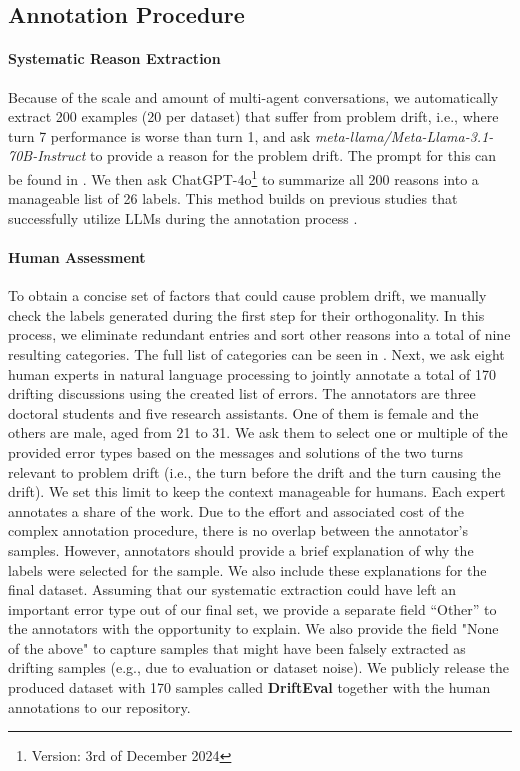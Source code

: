 \twocolumn

\subsection{Annotation Procedure}

\paragraph{\textbf{Systematic Reason Extraction}}
Because of the scale and amount of multi-agent conversations, we automatically extract 200 examples (20 per dataset) that suffer from problem drift, i.e., where turn 7 performance is worse than turn 1, and ask \textit{meta-llama/Meta-Llama-3.1-70B-Instruct} to provide a reason for the problem drift.
The prompt for this can be found in .
We then ask ChatGPT-4o\footnote{Version: 3rd of December 2024} to summarize all 200 reasons into a manageable list of 26 labels.
This method builds on previous studies that successfully utilize LLMs during the annotation process \citep{WangKRM24, KimMCR24}.

\paragraph{\textbf{Human Assessment}}
To obtain a concise set of factors that could cause problem drift, we manually check the labels generated during the first step for their orthogonality.
In this process, we eliminate redundant entries and sort other reasons into a total of nine resulting categories.
The full list of categories can be seen in .
Next, we ask eight human experts in natural language processing to jointly annotate a total of 170 drifting discussions using the created list of errors.
The annotators are three doctoral students and five research assistants.
One of them is female and the others are male, aged from 21 to 31.
We ask them to select one or multiple of the provided error types based on the messages and solutions of the two turns relevant to problem drift (i.e., the turn before the drift and the turn causing the drift).
We set this limit to keep the context manageable for humans.
Each expert annotates a share of the work.
Due to the effort and associated cost of the complex annotation procedure, there is no overlap between the annotator's samples.
However, annotators should provide a brief explanation of why the labels were selected for the sample.
We also include these explanations for the final dataset.
Assuming that our systematic extraction could have left an important error type out of our final set, we provide a separate field ``Other'' to the annotators with the opportunity to explain.
We also provide the field "None of the above" to capture samples that might have been falsely extracted as drifting samples (e.g., due to evaluation or dataset noise).
We publicly release the produced dataset with 170 samples called \textbf{DriftEval} together with the human annotations to our repository.

